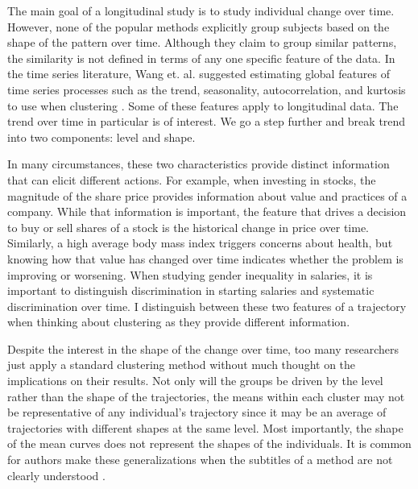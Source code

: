 The main goal of a longitudinal study is to study individual change over time. However, none of the popular methods explicitly group subjects based on the shape of the pattern over time. Although they claim to group similar patterns, the similarity is not defined in terms of any one specific feature of the data. In the time series literature, Wang et. al. suggested estimating global features of time series processes such as the trend, seasonality, autocorrelation, and kurtosis to use when clustering \cite{wang2006}. Some of these features apply to longitudinal data. The trend over time in particular is of interest. We go a step further and break trend into two components: level and shape. 

In many circumstances, these two characteristics provide distinct information that can elicit different actions. For example, when investing in stocks, the magnitude of the share price provides information about value and practices of a company. While that information is important, the feature that drives a decision to buy or sell shares of a stock is the historical change in price over time. Similarly, a high average body mass index triggers concerns about health, but knowing how that value has changed over time indicates whether the problem is improving or worsening. When studying gender inequality in salaries, it is important to distinguish discrimination in starting salaries  and systematic discrimination over time. I distinguish between these two features of a trajectory when thinking about clustering as they provide different information.  

Despite the interest in the shape of the change over time, too many researchers just apply a standard clustering method without much thought on the implications on their results. Not only will the groups be driven by the level rather than the shape of the trajectories, the means within each cluster may not be representative of any individual's trajectory since it may be an average of trajectories with different shapes at the same level. Most importantly, the shape of the mean curves does not represent the shapes of the individuals. It is common for authors make these generalizations when the subtitles of a method are not clearly understood \cite{windle2004,mulvaney2006,broadbent2008,pryor2011,mccoy2010}. 

